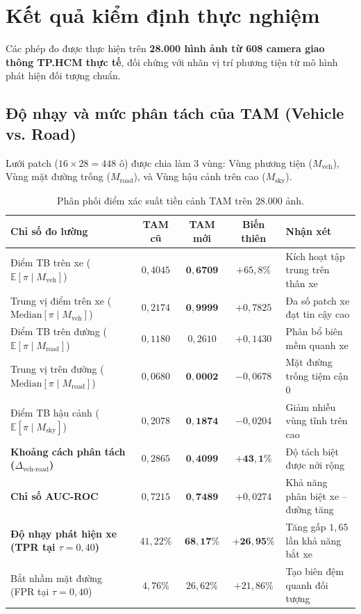 \documentclass[11pt,a4paper]{article}
\begin{document}
\section{Kết quả kiểm định thực nghiệm}

Các phép đo được thực hiện trên \textbf{28.000 hình ảnh từ 608 camera giao thông TP.HCM thực tế}, đối chứng với nhãn vị trí phương tiện từ mô hình phát hiện đối tượng chuẩn.

\subsection{Độ nhạy và mức phân tách của TAM (Vehicle vs. Road)}
Lưới patch ($16 \times 28 = 448$ ô) được chia làm 3 vùng: Vùng phương tiện ($M_{\text{veh}}$), Vùng mặt đường trống ($M_{\text{road}}$), và Vùng hậu cảnh trên cao ($M_{\text{sky}}$).

\begin{table}[H]
\centering
\small
\caption{Phân phối điểm xác suất tiền cảnh TAM trên $28.000$ ảnh.}
\label{tab:tam_metrics}
\begin{tabularx}{\textwidth}{>{\raggedright\arraybackslash}X ccc >{\raggedright\arraybackslash}p{4.8cm}}
\toprule
\textbf{Chỉ số đo lường} & \textbf{TAM cũ} & \textbf{TAM mới} & \textbf{Biến thiên} & \textbf{Nhận xét} \\
\midrule
Điểm TB trên xe ($\mathbb{E}[\pi \mid M_{\text{veh}}]$) & $0{,}4045$ & $\mathbf{0{,}6709}$ & $+65{,}8\%$ & Kích hoạt tập trung trên thân xe \\
Trung vị điểm trên xe ($\text{Median}[\pi \mid M_{\text{veh}}]$) & $0{,}2174$ & $\mathbf{0{,}9999}$ & $+0{,}7825$ & Đa số patch xe đạt tin cậy cao \\
Điểm TB trên đường ($\mathbb{E}[\pi \mid M_{\text{road}}]$) & $0{,}1180$ & $0{,}2610$ & $+0{,}1430$ & Phân bổ biên mềm quanh xe \\
Trung vị trên đường ($\text{Median}[\pi \mid M_{\text{road}}]$) & $0{,}0680$ & $\mathbf{0{,}0002}$ & $-0{,}0678$ & Mặt đường trống tiệm cận $0$ \\
Điểm TB hậu cảnh ($\mathbb{E}[\pi \mid M_{\text{sky}}]$) & $0{,}2078$ & $\mathbf{0{,}1874}$ & $-0{,}0204$ & Giảm nhiễu vùng tĩnh trên cao \\
\midrule
\textbf{Khoảng cách phân tách ($\Delta_{\text{veh-road}}$)} & $0{,}2865$ & $\mathbf{0{,}4099}$ & $\mathbf{+43{,}1\%}$ & Độ tách biệt được nới rộng \\
\textbf{Chỉ số AUC-ROC} & $0{,}7215$ & $\mathbf{0{,}7489}$ & $+0{,}0274$ & Khả năng phân biệt xe -- đường tăng \\
\textbf{Độ nhạy phát hiện xe (TPR tại $\tau = 0{,}40$)} & $41{,}22\%$ & $\mathbf{68{,}17\%}$ & $\mathbf{+26{,}95\%}$ & Tăng gấp $1{,}65$ lần khả năng bắt xe \\
Bắt nhầm mặt đường (FPR tại $\tau = 0{,}40$) & $4{,}76\%$ & $26{,}62\%$ & $+21{,}86\%$ & Tạo biên đệm quanh đối tượng \\
\bottomrule
\end{tabularx}
\end{table}
\end{document}
